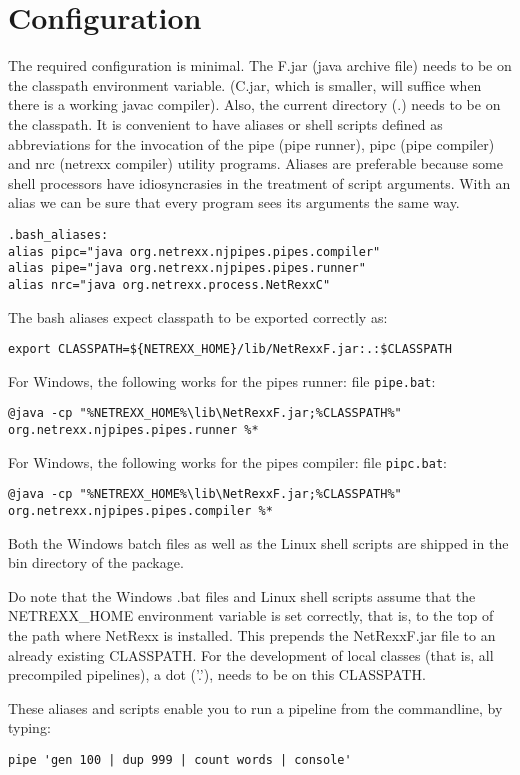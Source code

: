 \section{Configuration}
The required configuration is minimal. The \nr{}F.jar (java archive
file) needs to be on the classpath environment variable. (\nr{}C.jar, which is smaller, will suffice when there is a
working javac compiler).
Also, the current directory (.) needs to be on the classpath.
It is convenient to have aliases or shell scripts defined as abbreviations for the invocation of the pipe (pipe runner),
pipc (pipe compiler) and nrc (netrexx compiler) utility programs.
Aliases are preferable because some shell processors have
idiosyncrasies in the treatment of script arguments. With an alias we
can be sure that every \nr{} program sees its arguments the same
way.
\begin{lstlisting}
.bash_aliases:
alias pipc="java org.netrexx.njpipes.pipes.compiler"
alias pipe="java org.netrexx.njpipes.pipes.runner"
alias nrc="java org.netrexx.process.NetRexxC"
\end{lstlisting}
The bash aliases expect classpath to be exported correctly as:
\begin{lstlisting}
export CLASSPATH=${NETREXX_HOME}/lib/NetRexxF.jar:.:$CLASSPATH
\end{lstlisting}

For Windows, the following works for the pipes runner: file \texttt{pipe.bat}:
\begin{lstlisting}
@java -cp "%NETREXX_HOME%\lib\NetRexxF.jar;%CLASSPATH%" org.netrexx.njpipes.pipes.runner %*
\end{lstlisting}
For Windows, the following works for the pipes compiler: file \texttt{pipc.bat}:
\begin{lstlisting}
@java -cp "%NETREXX_HOME%\lib\NetRexxF.jar;%CLASSPATH%" org.netrexx.njpipes.pipes.compiler %*
\end{lstlisting}
Both the Windows batch files as well as the Linux shell scripts are shipped in the bin directory of the \nr{} package.
\begin{shaded}
  Do note that the Windows .bat files and Linux shell scripts assume that the NETREXX\_HOME
environment variable is set correctly, that is, to the top of the path
where NetRexx is installed. This prepends the NetRexxF.jar file to an
already existing CLASSPATH. For the development of local classes (that is, all precompiled pipelines), a
dot ('.'), needs to be on this CLASSPATH.
\end{shaded}
These aliases and scripts enable you to run a pipeline from the commandline, by typing:
\begin{lstlisting}
pipe 'gen 100 | dup 999 | count words | console'
\end{lstlisting}

